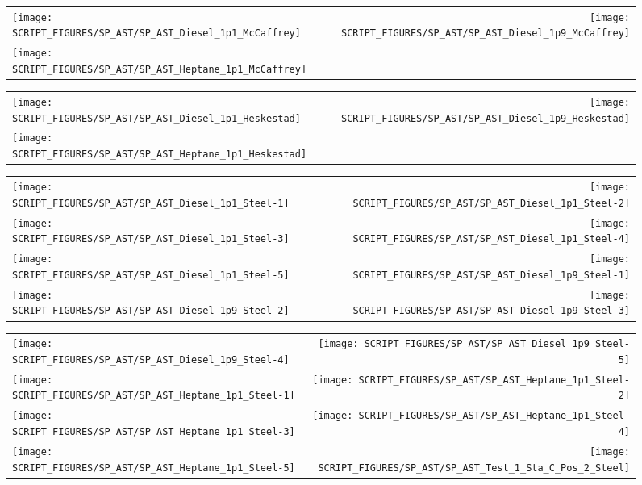 \begin{figure}[!ht]
\begin{tabular*}{\textwidth}{l@{\extracolsep{\fill}}r}
\texttt{[image: SCRIPT\_FIGURES/SP\_AST/SP\_AST\_Diesel\_1p1\_McCaffrey]} &
\texttt{[image: SCRIPT\_FIGURES/SP\_AST/SP\_AST\_Diesel\_1p9\_McCaffrey]} \\
\texttt{[image: SCRIPT\_FIGURES/SP\_AST/SP\_AST\_Heptane\_1p1\_McCaffrey]}
\end{tabular*}
\end{figure}

\begin{figure}[!ht]
\begin{tabular*}{\textwidth}{l@{\extracolsep{\fill}}r}
\texttt{[image: SCRIPT\_FIGURES/SP\_AST/SP\_AST\_Diesel\_1p1\_Heskestad]} &
\texttt{[image: SCRIPT\_FIGURES/SP\_AST/SP\_AST\_Diesel\_1p9\_Heskestad]} \\
\texttt{[image: SCRIPT\_FIGURES/SP\_AST/SP\_AST\_Heptane\_1p1\_Heskestad]}
\end{tabular*}
\end{figure}

\begin{figure}[!ht]
\begin{tabular*}{\textwidth}{l@{\extracolsep{\fill}}r}
\texttt{[image: SCRIPT\_FIGURES/SP\_AST/SP\_AST\_Diesel\_1p1\_Steel-1]} &
\texttt{[image: SCRIPT\_FIGURES/SP\_AST/SP\_AST\_Diesel\_1p1\_Steel-2]} \\
\texttt{[image: SCRIPT\_FIGURES/SP\_AST/SP\_AST\_Diesel\_1p1\_Steel-3]} &
\texttt{[image: SCRIPT\_FIGURES/SP\_AST/SP\_AST\_Diesel\_1p1\_Steel-4]} \\
\texttt{[image: SCRIPT\_FIGURES/SP\_AST/SP\_AST\_Diesel\_1p1\_Steel-5]} &
\texttt{[image: SCRIPT\_FIGURES/SP\_AST/SP\_AST\_Diesel\_1p9\_Steel-1]} \\
\texttt{[image: SCRIPT\_FIGURES/SP\_AST/SP\_AST\_Diesel\_1p9\_Steel-2]} &
\texttt{[image: SCRIPT\_FIGURES/SP\_AST/SP\_AST\_Diesel\_1p9\_Steel-3]}
\end{tabular*}
\end{figure}

\begin{figure}[!ht]
\begin{tabular*}{\textwidth}{l@{\extracolsep{\fill}}r}
\texttt{[image: SCRIPT\_FIGURES/SP\_AST/SP\_AST\_Diesel\_1p9\_Steel-4]} &
\texttt{[image: SCRIPT\_FIGURES/SP\_AST/SP\_AST\_Diesel\_1p9\_Steel-5]} \\
\texttt{[image: SCRIPT\_FIGURES/SP\_AST/SP\_AST\_Heptane\_1p1\_Steel-1]} &
\texttt{[image: SCRIPT\_FIGURES/SP\_AST/SP\_AST\_Heptane\_1p1\_Steel-2]} \\
\texttt{[image: SCRIPT\_FIGURES/SP\_AST/SP\_AST\_Heptane\_1p1\_Steel-3]} &
\texttt{[image: SCRIPT\_FIGURES/SP\_AST/SP\_AST\_Heptane\_1p1\_Steel-4]} \\
\texttt{[image: SCRIPT\_FIGURES/SP\_AST/SP\_AST\_Heptane\_1p1\_Steel-5]} &
\texttt{[image: SCRIPT\_FIGURES/SP\_AST/SP\_AST\_Test\_1\_Sta\_C\_Pos\_2\_Steel]}
\end{tabular*}
\end{figure}

